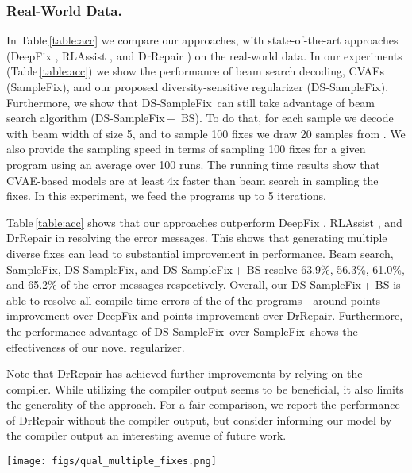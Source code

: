 \documentclass[runningheads]{llncs}
\newcommand{\samplefix}{SampleFix}
\newcommand{\dssmaplefix}{DS-SampleFix}
\newcommand{\tableref}{Table}
\begin{document}
\subsubsection{Real-World Data.}  In \tableref \,\ref{table:acc} we compare our approaches, with state-of-the-art approaches (DeepFix \cite{Gupta2017DeepFixFC}, RLAssist \cite{gupta2019RLAssist}, and DrRepair \cite{yasunaga2020repair}) on the real-world data. In our experiments (\tableref \,\ref{table:acc}) we show the performance of beam search decoding, CVAEs (\samplefix), and our proposed diversity-sensitive regularizer (\dssmaplefix). Furthermore, we show that \dssmaplefix\, can still take advantage of beam search algorithm (\dssmaplefix\,+~BS). To do that, for each sample  we decode with beam width of size 5, and to sample 100 fixes we draw 20 samples from . We also provide the sampling speed in terms of sampling 100 fixes for a given program using an average over 100 runs. The running time results show that CVAE-based models are at least 4x faster than beam search in sampling the fixes. In this experiment, we feed the programs up to 5 iterations.

\tableref \,\ref{table:acc} shows that our approaches outperform DeepFix \cite{Gupta2017DeepFixFC}, RLAssist \cite{gupta2019RLAssist}, and DrRepair \cite{yasunaga2020repair} in resolving the error messages. This shows that generating multiple diverse fixes can lead to substantial improvement in performance. Beam search, \samplefix, \dssmaplefix, and \dssmaplefix \,+ BS resolve 63.9\%, 56.3\%, 61.0\%, and 65.2\% of the error messages respectively.
Overall, our \dssmaplefix \,+ BS is able to resolve all compile-time errors of the  of the programs - around  points improvement over DeepFix and  points improvement over DrRepair. Furthermore, the performance advantage of \dssmaplefix \, over \samplefix \, shows the effectiveness of our novel regularizer. 


Note that DrRepair \cite{yasunaga2020repair} has achieved further improvements by relying on the compiler. While utilizing the compiler output seems to be beneficial, it also limits the generality of the approach.
For a fair comparison, we report the performance of DrRepair without the compiler output, but consider informing our model by the compiler output an interesting avenue of future work.




\begin{figure*}[h] 
	\centering
	    \centering
		\texttt{[image: figs/qual\_multiple\_fixes.png]}
	
	\caption{An example illustrating that our DS-SampleFix can generate diverse fixes. Left: Example of a program with a typographic error. The error, i.e., missing bracket, is highlighted at line 13. Right: Our DS-SampleFix proposes multiple fixes for the given error (line number with the corresponding fix), highlighting the ability of DS-SampleFix to generate diverse and accurate fixes.}
	\label{fig:example1}
\end{figure*}
\end{document}
